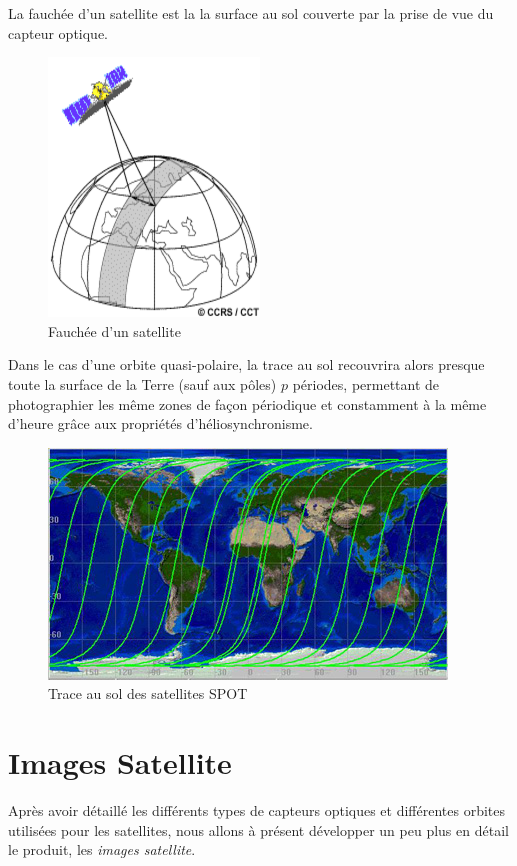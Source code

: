 \documentclass[a4paper, 10pt]{report}
\begin{document}
La fauchée d'un satellite est la la surface au sol couverte par la prise de vue du capteur optique.
\begin{figure}[H]
	\begin{center}
		\includegraphics[scale=0.4]{Images/Swath.png}
		\caption{Fauchée d'un satellite}
	\end{center}
\end{figure}
Dans le cas d'une orbite quasi-polaire, la trace au sol recouvrira alors presque toute la surface de la Terre (sauf aux pôles) $p$ périodes, permettant de photographier les même zones de façon périodique et constamment à la même d'heure grâce aux propriétés d'héliosynchronisme.
\begin{figure}[H]
	\begin{center}
		\includegraphics[scale=0.5]{Images/Trace_Sol_SPOT.jpg}
		\caption{Trace au sol des satellites SPOT}
	\end{center}
\end{figure}
\section{Images Satellite}
Après avoir détaillé les différents types de capteurs optiques et différentes orbites utilisées pour les satellites, nous allons à présent développer un peu plus en détail le produit, les \emph{images satellite}.
\end{document}
